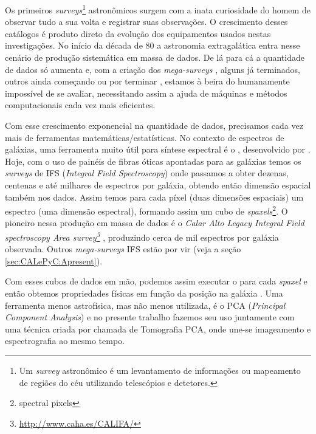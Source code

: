 Os primeiros {\em surveys}\footnote{Um {\em survey} astronômico é um
levantamento de informações ou mapeamento de regiões do céu utilizando
telescópios e detetores.} astronômicos surgem com a inata curiosidade do homem
de observar tudo a sua volta e registrar suas observações. O crescimento desses
catálogos é produto direto da evolução dos equipamentos usados nestas
investigações. No início da década de 80 \citep{Huchra1983, Huchra1988,
DaCosta1988} a astronomia extragalática entra nesse cenário de produção
sistemática em massa de dados. De lá para cá a quantidade de dados só aumenta e,
com a criação dos {\em mega-surveys} \citep[\SDSS; ][]{York2000}
\citep[2dFGRS;][]{Colless1999} \citep[2MASS;][]{Skrutskie2006}, alguns já
terminados, outros ainda começando ou por terminar \citep[LSST; ][]{Ivezic2008}
\citep[J-PAS;][]{Benitez2009}, estamos à beira do humanamente impossível de se
avaliar, necessitando assim a ajuda de máquinas e métodos computacionais cada
vez mais eficientes.

Com esse crescimento exponencial na quantidade de dados, precisamos cada vez
mais de ferramentas matemáticas/estatísticas. No contexto de espectros de
galáxias, uma ferramenta muito útil para síntese espectral é o \starlight,
desenvolvido por \citet{CidFernandes2005}. Hoje, com o uso de painéis de fibras
óticas apontadas para as galáxias temos os {\em surveys} de IFS ({\em Integral
Field Spectroscopy}) onde passamos a obter dezenas, centenas e até milhares de
espectros por galáxia, obtendo então dimensão espacial também nos dados. Assim
temos para cada píxel (duas dimensões espaciais) um espectro (uma dimensão
espectral), formando assim um cubo de {\em spaxels}\footnote{spectral pixels}. O
pioneiro nessa produção em massa de dados é o {\em Calar Alto Legacy Integral
Field spectroscopy Area survey\footnote{\url{http://www.caha.es/CALIFA/}}}
\citep[CALIFA; ][]{CALIFAPresent2012}, produzindo cerca de mil espectros por
galáxia observada. Outros {\em mega-surveys} IFS estão por vir (veja a seção
\ref{sec:CALePyC:Apresent}).

Com esses cubos de dados em mão, podemos assim executar o \starlight para
cada {\em spaxel} e então obtemos propriedades físicas em função da posição na
galáxia \citep{CidFernandes2013a}. Uma ferramenta menos astrofísica, mas não
menos utilizada, é o PCA ({\em Principal Component Analysis}) e no presente
trabalho fazemos seu uso juntamente com uma técnica criada por
\citet{Steiner2009} chamada de Tomografia PCA, onde une-se imageamento e
espectrografia ao mesmo tempo.

